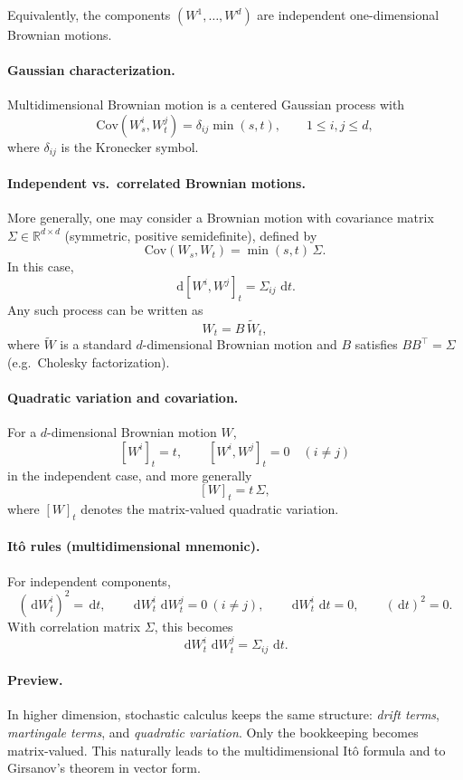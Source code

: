 \documentclass[11pt]{article}
\newcommand{\R}{\mathbb{R}}
\newcommand{\Cov}{\mathrm{Cov}}
\newcommand{\dd}{\,\mathrm{d}}
\newcommand{\1}{\mathbf{1}}
\theoremstyle{plain}
\theoremstyle{definition}
\theoremstyle{remark}
\begin{document}
Equivalently, the components $(W^1,\dots,W^d)$ are independent
one-dimensional Brownian motions.

\paragraph{Gaussian characterization.}
Multidimensional Brownian motion is a centered Gaussian process with
\[
\Cov(W_s^i,W_t^j)=\delta_{ij}\min(s,t),
\qquad 1\le i,j\le d,
\]
where $\delta_{ij}$ is the Kronecker symbol.

\paragraph{Independent vs.\ correlated Brownian motions.}
More generally, one may consider a Brownian motion with covariance matrix
$\Sigma\in\R^{d\times d}$ (symmetric, positive semidefinite), defined by
\[
\Cov(W_s,W_t)=\min(s,t)\,\Sigma.
\]
In this case,
\[
\dd[W^i,W^j]_t=\Sigma_{ij}\,\dd t.
\]
Any such process can be written as
\[
W_t = B\,\widetilde W_t,
\]
where $\widetilde W$ is a standard $d$-dimensional Brownian motion
and $B$ satisfies $BB^\top=\Sigma$ (e.g.\ Cholesky factorization).

\paragraph{Quadratic variation and covariation.}
For a $d$-dimensional Brownian motion $W$,
\[
[W^i]_t = t,
\qquad
[W^i,W^j]_t = 0 \quad (i\neq j)
\]
in the independent case, and more generally
\[
[W]_t = t\,\Sigma,
\]
where $[W]_t$ denotes the matrix-valued quadratic variation.

\paragraph{It\^o rules (multidimensional mnemonic).}
For independent components,
\[
(\dd W_t^i)^2=\dd t,
\qquad
\dd W_t^i\,\dd W_t^j=0 \ (i\neq j),
\qquad
\dd W_t^i\,\dd t=0,
\qquad
(\dd t)^2=0.
\]
With correlation matrix $\Sigma$, this becomes
\[
\dd W_t^i\,\dd W_t^j=\Sigma_{ij}\,\dd t.
\]

\paragraph{Preview.}
In higher dimension, stochastic calculus keeps the same structure:
\emph{drift terms}, \emph{martingale terms}, and \emph{quadratic variation}.
Only the bookkeeping becomes matrix-valued.
This naturally leads to the multidimensional It\^o formula
and to Girsanov’s theorem in vector form.
\end{document}
